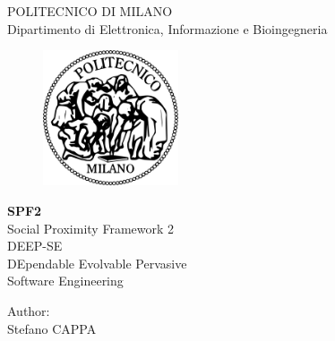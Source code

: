 \thispagestyle{empty}
\vspace*{-1.5cm} \bfseries{
\begin{center}
  \large
  POLITECNICO DI MILANO\\
  \normalsize
  Dipartimento di Elettronica, Informazione e Bioingegneria\\
  
  \vspace*{0.5cm}
  
  \begin{figure}[htbp]
    \begin{center}
      \includegraphics[width=4cm]{images/polimi.png}
    \end{center}
  \end{figure}
  \vspace*{0.3cm} 
  
  \LARGE
  \textbf{SPF2}\\
  Social Proximity Framework 2\\

  \vspace*{.75truecm} \large
  DEEP-SE \\
  DEpendable Evolvable Pervasive\\
  Software Engineering
\end{center}
\vspace*{3.0cm} \large
\begin{flushleft}


\end{flushleft}
\vspace*{1.0cm}
\begin{flushright}


  Author:\\ 
  Stefano CAPPA

\end{flushright}
\vspace*{0.5cm}
\begin{center}

\end{center} \clearpage
}
